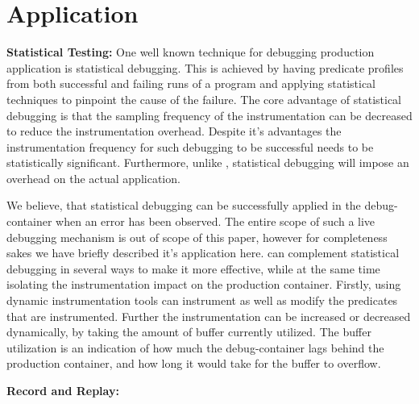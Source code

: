 \section{Application}
\label{statistical}

\textbf{Statistical Testing:}
One well known technique for debugging production application is statistical debugging. 
This is achieved by having predicate profiles from both successful and failing runs of a program and applying statistical techniques to pinpoint the cause of the failure.
The core advantage of statistical debugging is that the sampling frequency of the instrumentation can be decreased to reduce the instrumentation overhead.
Despite it's advantages the instrumentation frequency for such debugging to be successful needs to be statistically significant. 
Furthermore, unlike \parikshan, statistical debugging will impose an overhead on the actual application. 

We believe, that statistical debugging can be successfully applied in the debug-container when an error has been observed. 
The entire scope of such a live debugging mechanism is out of scope of this paper, however for completeness sakes we have briefly described it's application here. 
\parikshan can complement statistical debugging in several ways to make it more effective, while at the same time isolating the instrumentation impact on the production container.
Firstly, using dynamic instrumentation tools \parikshan can instrument as well as modify the predicates that are instrumented.
Further the instrumentation can be increased or decreased dynamically, by taking the amount of buffer currently utilized. 
The buffer utilization is an indication of how much the debug-container lags behind the production container, and how long it would take for the buffer to overflow.

\textbf{Record and Replay:}
